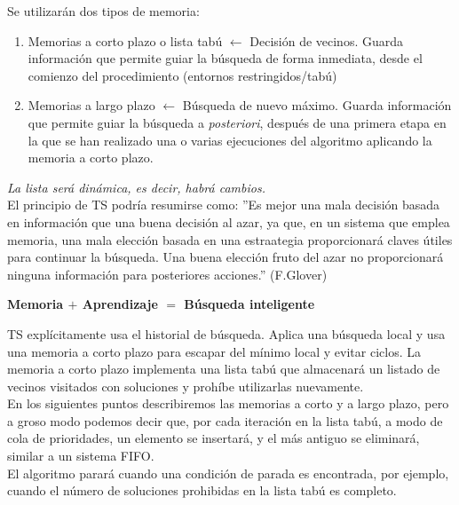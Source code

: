 \documentclass{llncs}
\begin{document}
Se utilizar\'{a}n dos tipos de memoria:
\begin{enumerate}
\item Memorias a corto plazo o lista tab\'{u} $\gets$ Decisi\'{o}n de vecinos. Guarda informaci\'{o}n que permite guiar la b\'{u}squeda de forma inmediata, desde el comienzo del procedimiento (entornos restringidos/tab\'{u})
\item Memorias a largo plazo $\gets$ B\'{u}squeda de nuevo m\'{a}ximo. Guarda informaci\'{o}n que permite guiar la b\'{u}squeda a \textit{posteriori}, despu\'{e}s de una primera etapa en la que se han realizado una o varias ejecuciones del algoritmo aplicando la memoria a corto plazo.
\end{enumerate}

\textit{La lista ser\'{a} din\'{a}mica, es decir, habr\'{a} cambios.}\\

El principio de TS podr\'{i}a resumirse como: ''Es mejor una mala decisi\'{o}n basada en informaci\'{o}n que una buena decisi\'{o}n al azar, ya que, en un sistema que emplea memoria, una mala elecci\'{o}n basada en una estraategia proporcionar\'{a} claves \'{u}tiles para continuar la b\'{u}squeda. Una buena elecci\'{o}n fruto del azar no proporcionar\'{a} ninguna informaci\'{o}n para posteriores acciones.'' (F.Glover)\\

\begin{center}
\textbf{Memoria $+$ Aprendizaje $=$ B\'{u}squeda inteligente}
\end{center}

TS expl\'{i}citamente usa el historial de b\'{u}squeda. Aplica una b\'{u}squeda local y usa una memoria a corto plazo para escapar del m\'{i}nimo local y evitar ciclos. La memoria a corto plazo implementa una lista tab\'{u} que almacenar\'{a} un listado de vecinos visitados con soluciones y proh\'{i}be utilizarlas nuevamente.\\

En los siguientes puntos describiremos las memorias a corto y a largo plazo, pero a groso modo podemos decir que, por cada iteraci\'{o}n en la lista tab\'{u}, a modo de cola de prioridades, un elemento se insertar\'{a}, y el m\'{a}s antiguo se eliminar\'{a}, similar a un sistema FIFO.\\

El algoritmo parar\'{a} cuando una condici\'{o}n de parada es encontrada, por ejemplo, cuando el n\'{u}mero de soluciones prohibidas en la lista tab\'{u} es completo.\\
\end{document}
